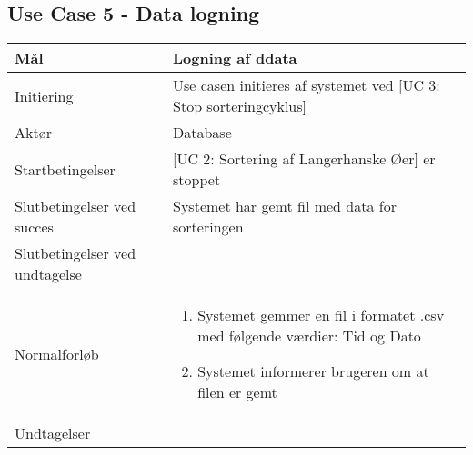 \subsection{Use Case 5 - Data logning}
\begin{center}
		\begin{longtable}{ | m{4cm} | m{8cm}| } 
			\hline
			Mål & Logning af ddata \\ 
			\hline
			Initiering &  Use casen initieres af systemet ved [UC 3: Stop sorteringcyklus]\\
			\hline
			Aktør & Database \\ 
			\hline
			Startbetingelser & [UC 2: Sortering af Langerhanske Øer] er stoppet \\
			\hline	
			Slutbetingelser ved succes & Systemet har gemt fil med data for sorteringen \\
			\hline
			Slutbetingelser ved undtagelse &  \\
			\hline
			Normalforløb & \begin{enumerate}
				\setlength\itemsep{0cm} %
				\item Systemet gemmer en fil i formatet .csv med følgende værdier:
				\subitem Tid og Dato
				\item 	Systemet informerer brugeren om at filen er gemt
			\end{enumerate} \\ 
			\hline
			Undtagelser & \\
			\hline
		\end{longtable}
		
	\end{center}
	\pagebreak